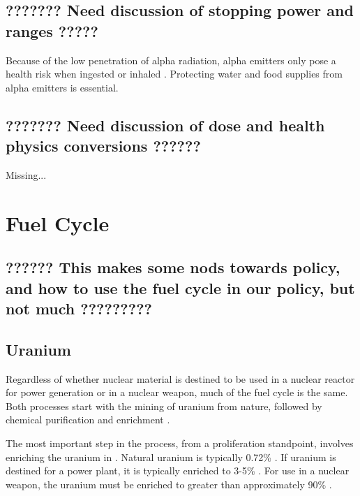 \documentclass{report}
\begin{document}
\subsection{??????? Need discussion of stopping power and ranges  ?????}

Because of the low penetration of alpha radiation, alpha emitters only pose a health risk when ingested or inhaled \cite{CentersforDiseaseControlandPrevention}.  Protecting water and food supplies from alpha emitters is essential. 


\subsection{??????? Need discussion of dose and health physics conversions   ??????}

Missing...














\section{Fuel Cycle}



\subsection{??????  This makes some nods towards policy, and how to use the fuel cycle in our policy, but not much  ?????????}


\subsection{Uranium}

Regardless of whether nuclear material is destined to be used in a nuclear reactor for power generation or in a nuclear weapon, much of the fuel cycle is the same. Both processes start with the mining of uranium from nature, followed by chemical purification and enrichment \cite{Moody2014}.

The most important step in the process, from a proliferation standpoint, involves enriching the uranium in . Natural uranium is typically 0.72\%  \cite{Benedict1981}.  If uranium is destined for a power plant, it is typically enriched to  3-5\% . For use in a nuclear weapon, the uranium must be enriched to greater than approximately 90\%  \cite{Moody2014}. 
\end{document}
